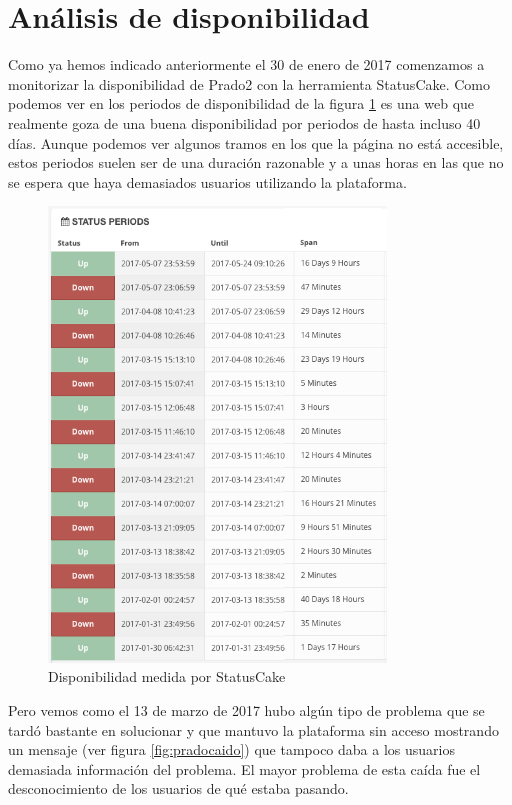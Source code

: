 \section{Análisis de disponibilidad}

Como ya hemos indicado anteriormente el 30 de enero de 2017 comenzamos a monitorizar la disponibilidad de Prado2 con la herramienta StatusCake. Como podemos ver en los periodos de disponibilidad de la figura \ref{fig:statuscake1} es una web que realmente goza de una buena disponibilidad por periodos de hasta incluso 40 días. Aunque podemos ver algunos tramos en los que la página no está accesible, estos periodos suelen ser de una duración razonable y a unas horas en las que no se espera que haya demasiados usuarios utilizando la plataforma.

\begin{figure}[h!]
\centering
\includegraphics[width=0.8\textwidth]{../screenshots/statuscake1}
\caption{Disponibilidad medida por StatusCake}
\label{fig:statuscake1}
\end{figure}

\bigskip
Pero vemos como el 13 de marzo de 2017 hubo algún tipo de problema que se tardó bastante en solucionar y que mantuvo la plataforma sin acceso mostrando un mensaje (ver figura \ref{fig:pradocaido}) que tampoco daba a los usuarios demasiada información del problema. El mayor problema de esta caída fue el desconocimiento de los usuarios de qué estaba pasando.

